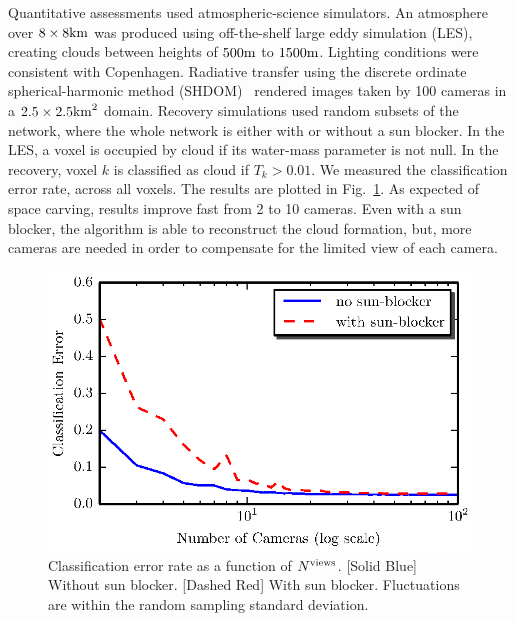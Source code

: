 \documentclass[runningheads]{llncs}
\begin{document}
Quantitative assessments used atmospheric-science simulators.
An atmosphere over $8\times8{\rm km}$  was produced using off-the-shelf large eddy simulation (LES), creating clouds between heights of $500{\rm m}$ to $1500{\rm m}$.
Lighting conditions were consistent with Copenhagen.
Radiative transfer using the discrete ordinate spherical-harmonic method (SHDOM)~\cite{Evans1998} rendered images taken by 100 cameras in a $2.5\times 2.5{\rm km}^2$ domain. Recovery simulations used random subsets
of the network, where the whole network is either with or without
a sun blocker. In the LES, a voxel is occupied by cloud if its water-mass parameter is not null. In the recovery, voxel $k$ is classified as cloud if $T_k>0.01$.
We measured the classification error rate, across all voxels.
The results are plotted in Fig.~\ref{fig:simulations}.  As expected of space carving,
results improve fast from 2 to 10 cameras. Even with a sun blocker,
the algorithm is able to reconstruct the cloud formation, but, more cameras are needed in order to compensate for the limited view of
each camera.
\begin{figure}
  \begin{center}
    \includegraphics{figures/simulations.eps}
    \caption{Classification error rate as a function of {$N^{\rm views}$}. [Solid Blue] Without sun blocker. [Dashed Red] With sun blocker.
    Fluctuations are within the random sampling standard deviation.}
    \label{fig:simulations}
  \end{center}
\end{figure}
\end{document}

